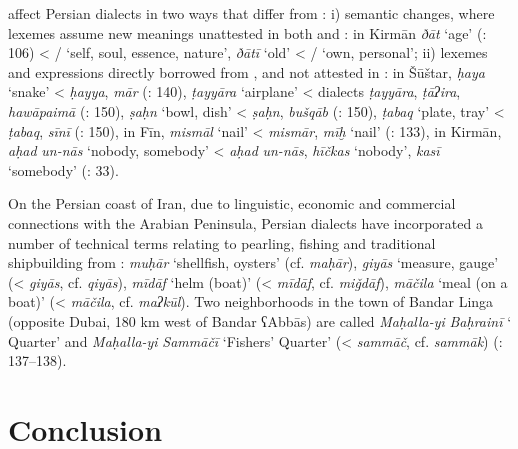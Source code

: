 \documentclass[output=paper]{langsci/langscibook}
\begin{document}
  affect Persian dialects in two ways that differ from : i) semantic changes, where  lexemes assume new meanings unattested in both  and : in Kirmān \textit{ðāt} ‘age’   (\citealt{Ṣarrāfī1996}: 106) < / ‘self, soul, essence, nature’, \textit{ðātī} ‘old’ < / ‘own, personal’; ii) lexemes and expressions directly borrowed from , and not attested in : in Šūštar, \textit{ḥaya} ‘snake’ <  \textit{ḥayya},  \textit{mār} (\citealt{Fāẓilī2004}: 140), \textit{ṭayyāra} ‘airplane’ <  dialects \textit{ṭayyāra},  \textit{ṭāʔira},  \textit{hawāpaimā} (\citealt{Fāẓilī2004}: 150), \textit{ṣaḥn} ‘bowl, dish’ <  \textit{ṣaḥn},  \textit{bušqāb} (\citealt{Fāẓilī2004}: 150), \textit{ṭabaq} ‘plate, tray’ <  \textit{ṭabaq},  \textit{sīnī} (\citealt{Fāẓilī2004}: 150), in Fīn, \textit{mismāl} ‘nail’ <  \textit{mismār},  \textit{mīḫ} ‘nail’ (\citealt{NaǧībiFīni2002}: 133), in Kirmān, \textit{aḥad} \textit{un-nās} ‘nobody, somebody’ <  \textit{aḥad} \textit{un-nās},  \textit{hīčkas} ‘nobody’, \textit{kasī} ‘somebody’ (\citealt{Ṣarrāfī1996}: 33).

On the Persian  coast of Iran, due to linguistic, economic and commercial connections with the Arabian Peninsula, Persian dialects have incorporated a number of  technical terms relating to pearling, fishing and traditional shipbuilding from  : \textit{muḥār} ‘shellfish, oysters’ (cf.  \textit{maḥār}), \textit{giyās} ‘measure, gauge’ (<  \textit{giyās}, cf.  \textit{qiyās}), \textit{mīdāf} ‘helm (boat)’ (<  \textit{mīdāf}, cf.  \textit{miǧdāf}), \textit{māčila} ‘meal (on a boat)’ (<  \textit{māčila}, cf.  \textit{maʔkūl}). Two neighborhoods in the town of Bandar Linga (opposite Dubai, 180 km west of Bandar ʕAbbās) are called \textit{Maḥalla-yi} \textit{Baḥrainī} ‘ Quarter’ and \textit{Maḥalla-yi} \textit{Sammāčī} ‘Fishers’ Quarter’ (<  \textit{sammāč}, cf.  \textit{sammāk}) (\citealt{Baḫtiyārī1990}: 137–138).

\section{Conclusion}
\end{document}
